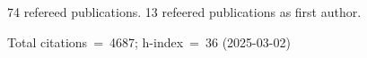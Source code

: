 74 refereed publications. 13 refeered publications as first author.

Total citations~=~4687; h-index~=~36 (2025-03-02)